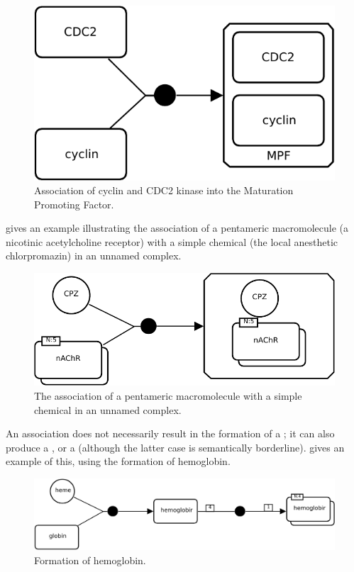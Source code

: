 \begin{figure}[H]
  \centering
  \includegraphics[scale = 0.8]{images/build/association_mpf_example.pdf}
  \caption{Association of cyclin and CDC2 kinase into the Maturation Promoting Factor.}
  \label{fig:assoc-cyclin}
\end{figure}

 gives an example illustrating the association of a pentameric macromolecule (a nicotinic acetylcholine receptor) with a simple chemical (the local anesthetic chlorpromazin) in an unnamed complex.

\begin{figure}[H]
  \centering
  \includegraphics[scale = 0.8]{images/build/association_unamed_example.pdf}
  \caption{The association of a pentameric macromolecule with a simple chemical in an unnamed complex.}
  \label{fig:assoc-unamed}
\end{figure}

An association does not necessarily result in the formation of a ; it can also produce a , or a  (although the latter case is semantically borderline).   gives an example of this, using the formation of hemoglobin.

\begin{figure}[H]
  \centering
  \includegraphics[scale = 0.8]{images/build/association_multimerisation_example.pdf}
  \caption{Formation of hemoglobin.}
  \label{fig:assoc-multi}
\end{figure}
